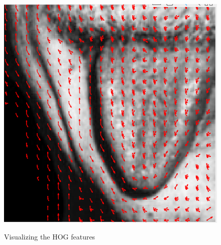 \documentclass[letter, 11pt]{article}
\begin{document}
\begin{figure}[!h]
  \label{fig:HOG EYE IMAGE}
\endminipage\hfill
{}
  \includegraphics[width=\linewidth]{HW1/RESULT/HOG_TONGUE.png}
  \label{fig:HOG TONGUE IMAGE}
\endminipage\hfill
\caption{Visualizing the HOG features}
\label{fig:fig}
\end{figure}
\end{document}
